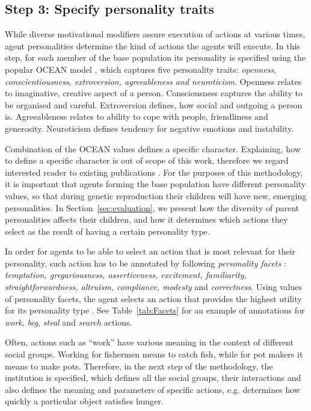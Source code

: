 \documentclass[graybox]{svmult}
\begin{document}
\subsection{Step 3: Specify personality traits}
\label{subSec:personalityTraits}

\label{sec:step3}

While diverse motivational modifiers assure execution of actions at various times, agent personalities determine the kind of actions the agents will execute.  In this step, for each member of the base population its personality is specified using the popular OCEAN model \cite{OCEAN}, which captures five personality traits: \textit{openness, conscientiousness, extroversion, agreeableness and neuroticism}. Openness relates to imaginative, creative aspect of a person. Consciousness captures the ability to be organised and careful. Extroversion defines, how social and outgoing a person is. Agreeableness relates to ability to cope with people, friendliness and generosity. Neuroticism defines tendency for negative emotions and instability. 

Combination of the OCEAN values defines a specific character. Explaining, how to define a specific character is out of scope of this work, therefore we regard interested reader to existing publications \cite{bartneck2002} \cite{Steunebrink_Dastani_Meyer_2009}. For the purposes of this methodology, it is important that agents forming the base population have different personality values, so that during genetic reproduction their children will have new, emerging personalities. In Section~\ref{sec:evaluation}, we present how the diversity of parent personalities affects their children, and how it determines which actions they select as the result of having a certain personality type. 

In order for agents to be able to select an action that is most relevant for their personality, such action has to be annotated by following \textit{personality facets} \cite{howard1995}: \textit{temptation, gregariousness, assertiveness, excitement, familiarity, straightforwardness, altruism, compliance, modesty} and \textit{correctness}. Using values of personality facets, the agent selects an action that provides the highest utility for its personality type \cite{bartneck2002} \cite{howard1995}. See Table~\ref{tab:Facets} for an example of annotations for \emph{work}, \emph{beg}, \emph{steal} and \emph{search} actions.

Often, actions such as ``work'' have various meaning in the context of different social groups. Working for fishermen means to catch fish, while for pot makers it means to make pots. Therefore, in the next step of the methodology, the institution is specified, which defines all the social groups, their interactions and also defines the meaning and parameters of specific actions, e.g. determines how quickly a particular object satisfies hunger.
\end{document}
